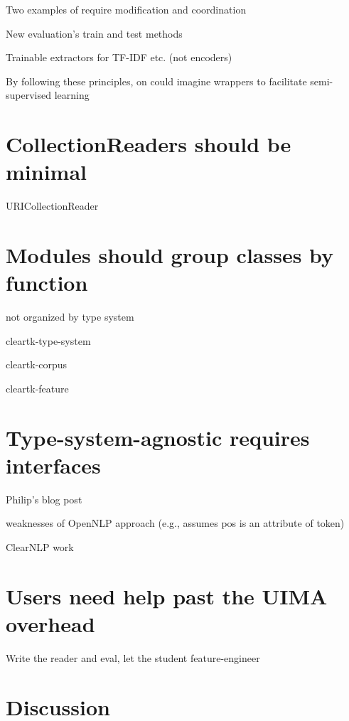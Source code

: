 \documentclass[10pt, a4paper]{article}
\begin{document}
Two examples of require modification and coordination 


New evaluation's train and test methods

Trainable extractors for TF-IDF etc. (not encoders)

By following these principles, on could imagine wrappers to facilitate semi-supervised 
learning 


\section{CollectionReaders should be minimal}

URICollectionReader


\section{Modules should group classes by function}
not organized by type system

cleartk-type-system

cleartk-corpus

cleartk-feature


\section{Type-system-agnostic requires interfaces}

Philip's blog post

weaknesses of OpenNLP approach (e.g., assumes pos is an attribute of token)

ClearNLP work


\section{Users need help past the UIMA overhead}

Write the reader and eval, let the student feature-engineer


\section{Discussion}



\end{document}
